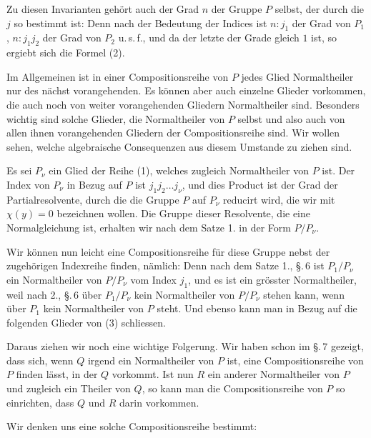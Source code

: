 
Zu diesen Invarianten geh\"ort auch der Grad $n$ der Gruppe $P$ selbst, der durch
die $j$ so bestimmt ist:
Denn nach der Bedeutung der Indices ist $n : j_1$ der Grad von $P_1$, $n : j_1 j_2$
der Grad von $P_2$ u.\,s.\,f., und da der letzte der Grade gleich $1$ ist, so ergiebt
sich die Formel (2).

Im Allgemeinen ist in einer Compositionsreihe von $P$ jedes Glied Normaltheiler nur
des n\"achst vorangehenden. Es k\"onnen aber auch einzelne Glieder vorkommen, die
auch noch von weiter vorangehenden Gliedern Normaltheiler sind. Besonders wichtig
sind solche Glieder, die Normaltheiler von $P$ selbst und also auch von allen ihnen
vorangehenden Gliedern der Compositionsreihe sind. Wir wollen sehen, welche
algebraische Consequenzen aus diesem Umstande zu ziehen sind.

Es sei $P_\nu$ ein Glied der Reihe (1), welches zugleich Normaltheiler von $P$ ist.
Der Index von $P_\nu$ in Bezug auf $P$ ist $j_1 j_2 \ldots j_\nu$, und dies Product
ist der Grad der Partialresolvente, durch die die Gruppe $P$ auf $P_\nu$ reducirt
wird, die wir mit $\chi(y) = 0$ bezeichnen wollen. Die Gruppe dieser Resolvente, die
eine Normalgleichung ist, erhalten wir nach dem Satze 1. in der Form $P/P_\nu$.

Wir k\"onnen nun leicht eine Compositionsreihe f\"ur diese Gruppe nebst der
zugeh\"origen Indexreihe finden, n\"amlich:
Denn nach dem Satze 1., \S.\,6 ist $P_1/P_\nu$ ein Normaltheiler von $P/P_\nu$ vom
Index $j_1$, und es ist ein gr\"osster Normaltheiler,
weil nach 2., \S.\,6 \"uber $P_1/P_\nu$ kein Normaltheiler von $P/P_\nu$ stehen
kann, wenn \"uber $P_1$ kein Normaltheiler von $P$ steht. Und ebenso kann man in
Bezug auf die folgenden Glieder von (3) schliessen.

Daraus ziehen wir noch eine wichtige Folgerung. Wir haben schon im \S.\,7 gezeigt,
dass sich, wenn $Q$ irgend ein Normaltheiler von $P$ ist, eine Compositionsreihe von
$P$ finden l\"asst, in der $Q$ vorkommt. Ist nun $R$ ein anderer Normaltheiler von
$P$ und zugleich ein Theiler von $Q$, so kann man die Compositionsreihe von $P$ so
einrichten, dass $Q$ und $R$ darin vorkommen.

Wir denken uns eine solche Compositionsreihe bestimmt:
